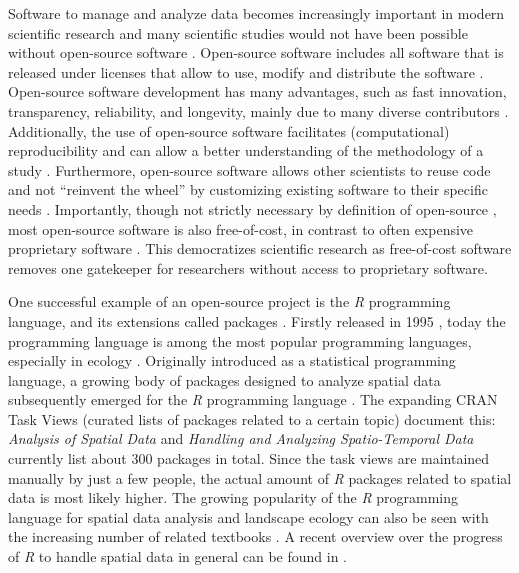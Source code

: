 \documentclass[smallextended]{svjour3}       %
\begin{document}
Software to manage and analyze data becomes increasingly important in modern scientific research \cite{Wilson2014} and many scientific studies would not have been possible without open-source software \cite{Prlic2012}.
Open-source software includes all software that is released under licenses that allow to use, modify and distribute the software \cite{St.Laurent2008}.
Open-source software development has many advantages, such as fast innovation, transparency, reliability, and longevity, mainly due to many diverse contributors \cite{vonKrogh2006,St.Laurent2008}.
Additionally, the use of open-source software facilitates (computational) reproducibility and can allow a better understanding of the methodology of a study \cite{Prlic2012,Powers2019}.
Furthermore, open-source software allows other scientists to reuse code and not ``reinvent the wheel'' \cite{Prlic2012} by customizing existing software to their specific needs \cite{Steiniger2009}.
Importantly, though not strictly necessary by definition of open-source \cite{Steiniger2009,Steiniger2009a}, most open-source software is also free-of-cost, in contrast to often expensive proprietary software \cite{vonKrogh2006,Steiniger2009,Steiniger2009a}.
This democratizes scientific research as free-of-cost software removes one gatekeeper for researchers without access to proprietary software.

One successful example of an open-source project is the \emph{R} programming language, and its extensions called packages \cite{RCoreTeam2019}.
Firstly released in 1995 \cite{Smith2016}, today the programming language is among the most popular programming languages, especially in ecology \cite{Lai2019}.
Originally introduced as a statistical programming language, a growing body of packages designed to analyze spatial data subsequently emerged for the \emph{R} programming language \cite{Bivand2006,Lovelace2019}.
The expanding CRAN Task Views (curated lists of packages related to a certain topic) document this: \emph{Analysis of Spatial Data} \cite{Bivand2019a} and \emph{Handling and Analyzing Spatio-Temporal Data} \cite{Pebesma2020} currently list about 300 packages in total.
Since the task views are maintained manually by just a few people, the actual amount of \emph{R} packages related to spatial data is most likely higher.
The growing popularity of the \emph{R} programming language for spatial data analysis and landscape ecology can also be seen with the increasing number of related textbooks \cite{Wegmann2016,Fletcher2018,Lovelace2019,Pebesma2019a}.
A recent overview over the progress of \emph{R} to handle spatial data in general can be found in \cite{Bivand2020}.
\end{document}

